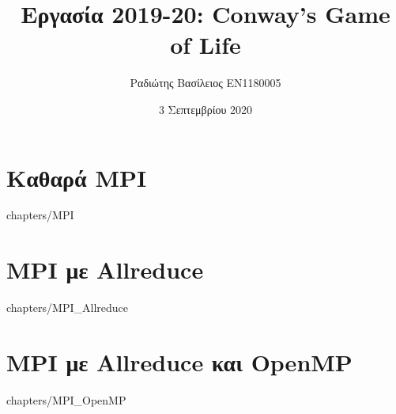 \documentclass[a4paper,12pt]{report}
\title {Εργασία 2019-20: Conway’s Game of Life}
\author {Ραδιώτης Βασίλειος EN1180005}
\date {3 Σεπτεμβρίου 2020}
\begin{document}
\maketitle

\tableofcontents{}

\chapter {Καθαρά MPI}
     {chapters/MPI}

\chapter {MPI με Allreduce}
     {chapters/MPI_Allreduce}

\chapter {MPI με Allreduce και OpenMP}
     {chapters/MPI_OpenMP}
\end{document}
